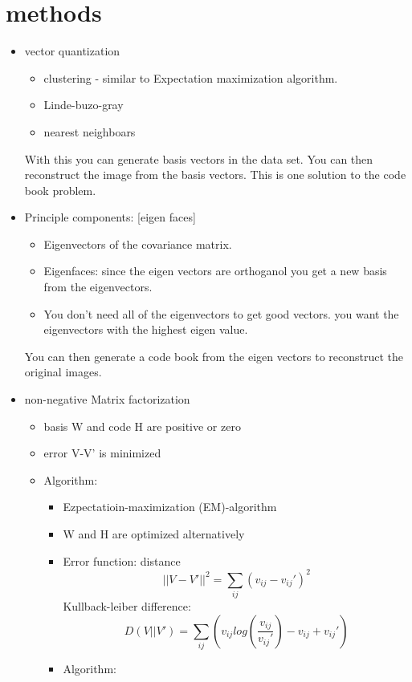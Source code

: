 \documentclass[letterpaper, 9pt]{article}
\begin{document}
\section{methods}
\begin{itemize}
\item vector quantization
\begin{itemize}
\item clustering - similar to Expectation maximization algorithm.
\item Linde-buzo-gray
\item nearest neighboars
\end{itemize}
With this you can generate basis vectors in the data set. You can then reconstruct the image from the basis vectors. This is one solution to the code book problem.
\item Principle components: [eigen faces]
\begin{itemize}
\item Eigenvectors of the covariance matrix.
\item Eigenfaces: since the eigen vectors are orthoganol you get a new basis from the eigenvectors.
\item You don't need all of the eigenvectors to get good vectors. you want the eigenvectors with the highest eigen value.
\end{itemize}
You can then generate a code book from the eigen vectors to reconstruct the original images.
\item non-negative Matrix factorization
\begin{itemize}
\item basis W and code H are positive or zero
\item error V-V' is minimized
\item Algorithm:
\begin{itemize}
\item Ezpectatioin-maximization (EM)-algorithm
\item W and H are optimized alternatively
\item Error function: distance
\begin{equation}
||V - V'||^2 = \sum_{ij}(v_{ij} - v_{ij}')^2
\end{equation}
Kullback-leiber difference:
\begin{equation}
D(V||V') = \sum_{ij} \left ( v_{ij} log(\frac{v_{ij}}{v_{ij}'}) - v_{ij} + v_{ij}' \right )
\end{equation}
\item  Algorithm:
\begin{equation}

\end{equation}
\end{itemize}
\end{itemize}
\end{itemize}
\end{document}
